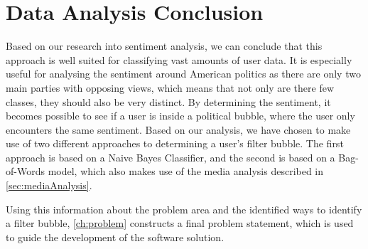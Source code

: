 \section{Data Analysis Conclusion}\label{sec:DAConc}
Based on our research into sentiment analysis, we can conclude that this
approach is well suited for classifying vast amounts of user data. It is
especially useful for analysing the sentiment around American politics as there
are only two main parties with opposing views, which means that not only are
there few classes, they should also be very distinct. By determining the
sentiment, it becomes possible to see if a user is inside a political bubble,
where the user only encounters the same sentiment. Based on our analysis, we
have chosen to make use of two different approaches to determining a user's
filter bubble. The first approach is based on a Naive Bayes Classifier, and the
second is based on a Bag-of-Words model, which also makes use of the media analysis
described in \autoref{sec:mediaAnalysis}.

Using this information about the problem area and the identified ways to
identify a filter bubble, \autoref{ch:problem} constructs a final problem statement,
which is used to guide the development of the software solution.

